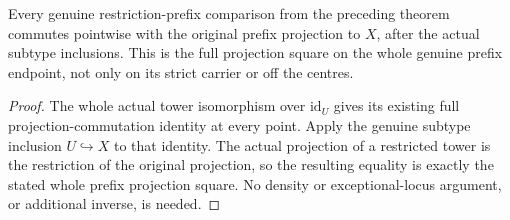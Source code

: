 \begin{theorem}
\label{hir:sharp-actual-curve-uniform-prefix-restriction-projection}
\leanok
Every genuine restriction-prefix comparison from the preceding theorem
commutes pointwise with the original prefix projection to $X$, after
the actual subtype inclusions. This is the full projection square on
the whole genuine prefix endpoint, not only on its strict carrier or
off the centres.
\end{theorem}
\begin{proof}
The whole actual tower isomorphism over $\mathrm{id}_U$ gives its
existing full projection-commutation identity at every point. Apply
the genuine subtype inclusion $U\hookrightarrow X$ to that identity.
The actual projection of a restricted tower is the restriction of
the original projection, so the resulting equality is exactly the
stated whole prefix projection square. No density or exceptional-locus
argument, or additional inverse, is needed.
\end{proof}

